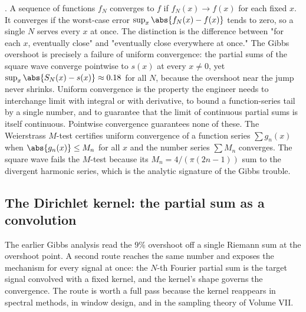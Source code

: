 \begin{mastery}
. A sequence of functions
$f_{N}$ converges  to $f$ if $f_{N}(x) \to f(x)$ for
each fixed $x$. It converges  if the worst-case error
$\sup_{x} \abs{f_{N}(x) - f(x)}$ tends to zero, so a single $N$ serves
every $x$ at once. The distinction is the difference between "for each
$x$, eventually close" and "eventually close everywhere at once." The
Gibbs overshoot is precisely a failure of uniform convergence: the
partial sums of the square wave converge pointwise to $s(x)$ at every
$x \neq 0$, yet $\sup_{x} \abs{S_{N}(x) - s(x)} \approx 0.18$ for all
$N$, because the overshoot near the jump never shrinks. Uniform
convergence is the property the engineer needs to interchange limit
with integral or with derivative, to bound a function-series tail by a
single number, and to guarantee that the limit of continuous partial
sums is itself continuous. Pointwise convergence guarantees none of
these. The Weierstrass $M$-test certifies uniform convergence of a
function series $\sum g_{n}(x)$ when $\abs{g_{n}(x)} \leq M_{n}$ for all
$x$ and the number series $\sum M_{n}$ converges. The square wave fails
the $M$-test because its $M_{n} = 4/(\pi(2n-1))$ sum to the divergent
harmonic series, which is the analytic signature of the Gibbs trouble.
\end{mastery}

\subsection{The Dirichlet kernel: the partial sum as a convolution}

The earlier Gibbs analysis read the $9\%$ overshoot off a single Riemann
sum at the overshoot point. A second route reaches the same number and
exposes the mechanism for every signal at once: the $N$-th Fourier
partial sum is the target signal convolved with a fixed kernel, and the
kernel's shape governs the convergence. The route is worth a full pass
because the kernel reappears in spectral methods, in window design, and
in the sampling theory of Volume VII.

